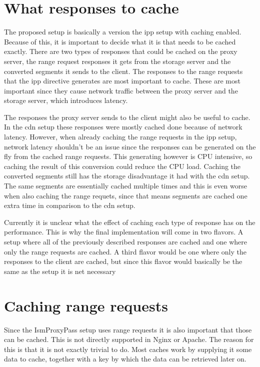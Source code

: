 \documentclass[twoside,openright]{uva-bachelor-thesis}
\begin{document}
\section{What responses to cache}
The proposed setup is basically a version the \gls{ipp} setup with
caching enabled. Because of this, it is important to decide what it is that
needs to be cached exactly. There are two types of responses that could be
cached on the proxy server, the range request responses it gets from the storage
server and the converted segments it sends to the client. The responses to the
range requests that the \acrlong{ipp} directive generates are most important to
cache. These are most important since they cause network traffic between the
proxy server and the storage server, which introduces latency.

The responses the proxy server sends to the client might also be useful to
cache. In the \gls{cdn} setup these responses were mostly cached done because of
network latency. However, when already caching the range requests in the
\gls{ipp} setup, network latency shouldn't be an issue since the responses can
be generated on the fly from the cached range requests. This generating however
is CPU intensive, so caching the result of this conversion could reduce the CPU
load. Caching the converted segments still has the storage disadvantage it had
with the \gls{cdn} setup. The same segments are essentially cached multiple
times and this is even worse when also caching the range requets, since that
means segments are cached one extra time in comparison to the \gls{cdn} setup.

Currently it is unclear what the effect of caching each type of response has on
the performance. This is why the final implementation will come in two
flavors. A setup where all of the previously described responses are cached and
one where only the range requests are cached. A third flavor would be one where
only the responses to the client are cached, but since this flavor would
basically be the same as the \cdn setup it is net necessary




\section{Caching range requests}\label{sec:caching}
Since the IsmProxyPass setup uses range requests it is also important that those
can be cached. This is not directly supported in Nginx or Apache. The reason for
this is that it is not exactly trivial to do. Most caches work by supplying it
some data to cache, together with a key by which the data can be retrieved later
on.
\end{document}
